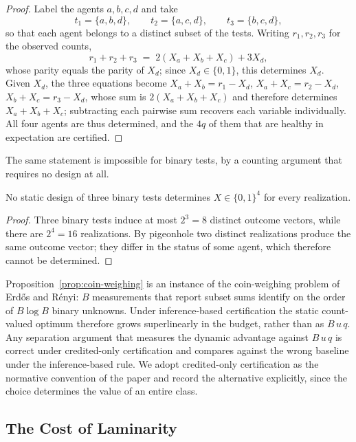 \begin{proof}
Label the agents $a,b,c,d$ and take
\[
  t_1=\{a,b,d\},\qquad t_2=\{a,c,d\},\qquad t_3=\{b,c,d\},
\]
so that each agent belongs to a distinct subset of the tests. Writing
$r_1,r_2,r_3$ for the observed counts,
\[
  r_1+r_2+r_3 \;=\; 2(X_a+X_b+X_c)+3X_d,
\]
whose parity equals the parity of $X_d$; since $X_d\in\{0,1\}$, this determines
$X_d$. Given $X_d$, the three equations become
$X_a+X_b=r_1-X_d$, $X_a+X_c=r_2-X_d$, $X_b+X_c=r_3-X_d$, whose sum is
$2(X_a+X_b+X_c)$ and therefore determines $X_a+X_b+X_c$; subtracting each
pairwise sum recovers each variable individually. All four agents are thus
determined, and the $4q$ of them that are healthy in expectation are certified.
\end{proof}

The same statement is impossible for binary tests, by a counting argument that
requires no design at all.

\begin{proposition}
\label{prop:binary-impossible}
No static design of three binary tests determines $X\in\{0,1\}^{4}$ for every
realization.
\end{proposition}

\begin{proof}
Three binary tests induce at most $2^{3}=8$ distinct outcome vectors, while
there are $2^{4}=16$ realizations. By pigeonhole two distinct realizations
produce the same outcome vector; they differ in the status of some agent, which
therefore cannot be determined.
\end{proof}

Proposition~\ref{prop:coin-weighing} is an instance of the coin-weighing problem
of Erd\H{o}s and R\'enyi: $B$ measurements that report subset sums identify on
the order of $B\log B$ binary unknowns. Under inference-based certification the
static count-valued optimum therefore grows superlinearly in the budget, rather
than as $B\,u\,q$. Any separation argument that measures the dynamic advantage
against $B\,u\,q$ is correct under credited-only certification and compares
against the wrong baseline under the inference-based rule. We adopt
credited-only certification as the normative convention of the paper and record
the alternative explicitly, since the choice determines the value of an entire
class.

\subsection{The Cost of Laminarity}
\label{sec:anatomy-laminar}

